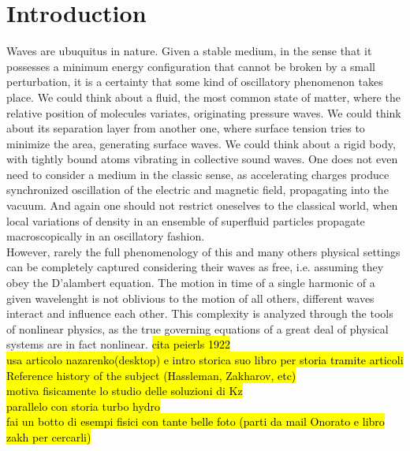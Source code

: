 

\newpage
\vphantom{}
\section*{Introduction}
    
    Waves are ubuquitus in nature. Given a stable medium, in the sense that it possesses a minimum energy configuration that cannot be broken by a small perturbation, it is a certainty that some kind of oscillatory phenomenon takes place. We could think about a fluid, the most common state of matter, where the relative position of molecules variates, originating pressure waves. We could think about its separation layer from another one, where surface tension tries to minimize the area, generating surface waves. We could think about a rigid body, with tightly bound atoms vibrating in collective sound waves. One does not even need to consider a medium in the classic sense, as accelerating charges produce synchronized oscillation of the electric and magnetic field, propagating into the vacuum. And again one should not restrict oneselves to the classical world, when local variations of density in an ensemble of superfluid particles propagate macroscopically in an oscillatory fashion. \\
    However, rarely the full phenomenology of this and many others physical settings can be completely captured considering their waves as free, i.e. assuming they obey the D'alambert equation. The motion in time of a single harmonic of a given wavelenght is not oblivious to the motion of all others, different waves interact and influence each other. This complexity is analyzed through the tools of nonlinear physics, as the true governing equations of a great deal of physical systems are in fact nonlinear. 
    \hl{
    cita peierls 1922 \\
    usa articolo nazarenko(desktop) e intro storica suo libro per storia tramite articoli\\
    Reference history of the subject (Hassleman, Zakharov, etc)\\
    motiva fisicamente lo studio delle soluzioni di Kz\\
    parallelo con storia turbo hydro\\
    fai un botto di esempi fisici con tante belle foto (parti da mail Onorato e libro zakh per cercarli)\\
    }

